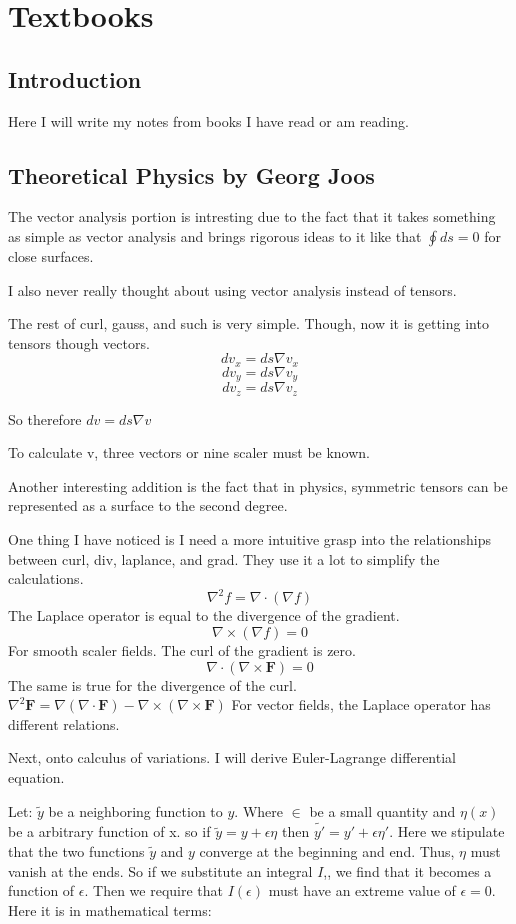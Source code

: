 \chapter{Textbooks}
\section{Introduction}
Here I will write my notes from books I have read or am reading.
\section{Theoretical Physics by Georg Joos}
\par The vector analysis portion is intresting due to the fact that it takes something as simple as vector analysis and brings rigorous ideas to it like that $\oint ds=0 $ for close surfaces. 
\par I also never really thought about using vector analysis instead of tensors. 
\par The rest of curl, gauss, and such is very simple. Though, now it is getting into tensors though vectors.
$$dv_x=ds\nabla v_x$$
$$dv_y=ds\nabla v_y$$
$$dv_z=ds\nabla v_z$$
\par So therefore $dv=ds \nabla v$
\par To calculate v, three vectors or nine scaler must be known.
\par Another interesting addition is the fact that in physics, symmetric tensors can be represented as a surface to the second degree.
\par One thing I have noticed is I need a more intuitive grasp into the relationships between curl, div, laplance, and grad. They use it a lot to simplify the calculations. 
$$\nabla^2 f = \nabla \cdot (\nabla f)$$
The Laplace operator is equal to the divergence of the gradient.
$$\nabla \times (\nabla f) = 0$$
For smooth scaler fields. The curl of the gradient is zero.
$$\nabla \cdot (\nabla \times \mathbf{F}) = 0$$
The same is true for the divergence of the curl.
$\nabla^2 \mathbf{F} = \nabla(\nabla \cdot \mathbf{F}) - \nabla \times (\nabla \times \mathbf{F})$
For vector fields, the Laplace operator has different relations.
\\
\par Next, onto calculus of variations. I will derive Euler-Lagrange differential equation.
\par Let: $\tilde{y}$ be a neighboring function to $y$. Where $\in$ be a small quantity and $\eta(x)$ be a arbitrary function of x. so if $\tilde{y}=y+\epsilon \eta$ then $\tilde{y'}=y'+ \epsilon \eta'$. Here we stipulate that the two functions $\tilde{y}$ and $y$ converge at the beginning and end. Thus, $\eta$ must vanish at the ends. So if we substitute an integral $I$,, we find that it becomes a function of $\epsilon$. Then we require that $I(\epsilon)$ must have an extreme value of $\epsilon=0$. Here it is in mathematical terms:
